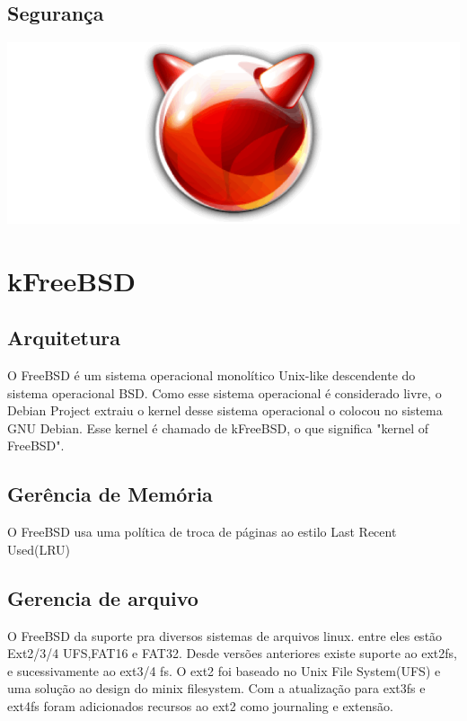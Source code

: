 \documentclass[conference]{IEEEtran}
\begin{document}
\subsection{Segurança}\label{sec:LinuxSec}

\includegraphics[scale = 0.2]{FreeBSD.png}\\
\section{kFreeBSD}\label{sec:BSD}

\subsection{Arquitetura}\label{sec:BSDArq}
O FreeBSD é um sistema operacional monolítico Unix-like descendente do sistema operacional BSD. Como esse sistema operacional é considerado livre, o Debian Project extraiu o kernel desse sistema operacional o colocou no sistema GNU Debian. Esse kernel é chamado de kFreeBSD, o que significa "kernel of FreeBSD".\cite{Debian-kFreeBSD-wiki}

\subsection{Gerência de Memória}\label{sec:BSDMem}
O FreeBSD usa uma política de troca de páginas ao estilo Last Recent Used(LRU)\cite{FreeBsdArc}

\subsection{Gerencia de arquivo}\label{sec:BSDArquivo}
O FreeBSD da suporte pra diversos sistemas de arquivos linux. entre eles estão Ext2/3/4 UFS,FAT16 e FAT32. Desde versões anteriores existe suporte ao ext2fs, e sucessivamente ao ext3/4 fs. O ext2 foi baseado no Unix File System(UFS) e uma solução ao design do minix filesystem. Com a atualização para ext3fs e ext4fs foram adicionados recursos ao ext2 como journaling e extensão. \\
\end{document}

